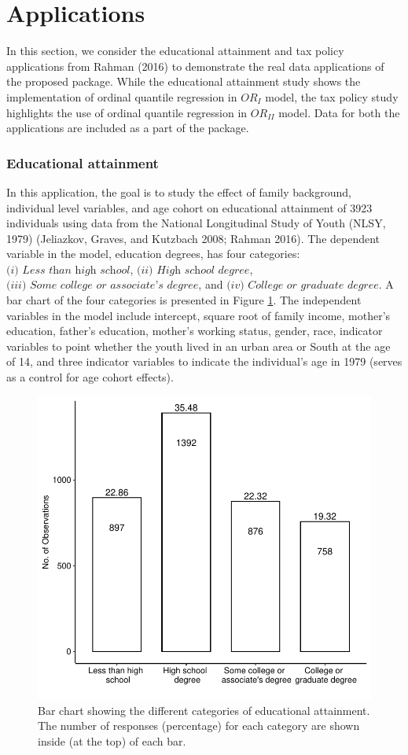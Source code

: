 \hypertarget{sec:Applications}{%
\section{Applications}\label{sec:Applications}}

In this section, we consider the educational attainment and tax policy applications from Rahman (2016) to demonstrate the real data applications of the proposed  package. While the educational attainment study shows the implementation of ordinal quantile regression in \(OR_{I}\) model, the tax policy study highlights the use of ordinal quantile regression in \(OR_{II}\) model. Data for both the applications are included as a part of the  package.

\hypertarget{subsec:EducAttainment}{%
\subsubsection{Educational attainment}\label{subsec:EducAttainment}}

In this application, the goal is to study the effect of family background, individual level variables, and age cohort on educational attainment of 3923 individuals using data from the National Longitudinal Study of Youth (NLSY, 1979) (Jeliazkov, Graves, and Kutzbach 2008; Rahman 2016). The dependent variable in the model, education degrees, has four categories: \(\textit{(i) Less than high school}\), \(\textit{(ii) High school degree}\), \(\textit{(iii) Some college or associate's degree}\), and \(\textit{(iv) College or graduate degree}\). A bar chart of the four categories is presented in Figure \ref{fig:EducFreqDist-tab-static}. The independent variables in the model include intercept, square root of family income, mother's education, father's education, mother's working status, gender, race, indicator variables to point whether the youth lived in an urban area or South at the age of 14, and three indicator variables to indicate the individual's age in 1979 (serves as a control for age cohort effects).

\begin{figure}

{\centering \includegraphics[width=0.55\linewidth,height=0.24\textheight]{EducFreqDist} 

}

\caption{Bar chart showing the different categories of educational attainment. The number of responses (percentage) for each category are shown inside (at the top) of each bar.}\label{fig:EducFreqDist-tab-static}
\end{figure}

